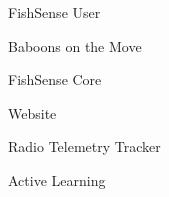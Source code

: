 \item FishSense User
\item Baboons on the Move
\item FishSense Core
\item Website
\item Radio Telemetry Tracker
\item Active Learning
